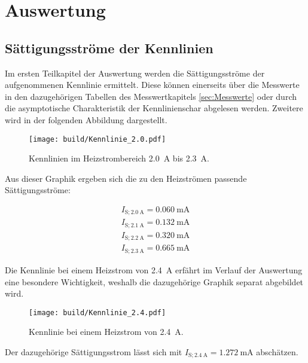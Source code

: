 %

%

\section{Auswertung}
\label{sec:Auswertung}

\subsection{Sättigungsströme der Kennlinien}
\label{sec:Saettigungsstrom}

Im ersten Teilkapitel der Auswertung werden die Sättigungsströme der aufgenommenen Kennlinie ermittelt. Diese können einerseits über die Messwerte in den
dazugehörigen Tabellen des Messwertkapitels \ref{sec:Messwerte} oder durch die asymptotische Charakteristik der Kennlinienschar abgelesen werden. Zweitere 
wird in der folgenden Abbildung dargestellt.

\begin{figure}[H]
    \centering
    \texttt{[image: build/Kennlinie\_2.0.pdf]}
    \caption{Kennlinien im Heizstrombereich \qty{2.0}{\ampere} bis \qty{2.3}{\ampere}.}
    \label{fig:Kennlinien1}
\end{figure}

\noindent Aus dieser Graphik ergeben sich die zu den Heizströmen passende Sättigungsströme:

\begin{align*}
    I_{\text{S};\qty{2.0}{\ampere}} = \qty{0.060}{\milli\ampere}\\
    I_{\text{S};\qty{2.1}{\ampere}} = \qty{0.132}{\milli\ampere}\\   
    I_{\text{S};\qty{2.2}{\ampere}} = \qty{0.320}{\milli\ampere}\\   
    I_{\text{S};\qty{2.3}{\ampere}} = \qty{0.665}{\milli\ampere}
\end{align*}

\noindent Die Kennlinie bei einem Heizstrom von \qty{2.4}{\ampere} erfährt im Verlauf der Auswertung eine besondere Wichtigkeit, weshalb die dazugehörige Graphik 
separat abgebildet wird. 

\begin{figure}[H]
    \centering 
    \texttt{[image: build/Kennlinie\_2.4.pdf]}
    \caption{Kennlinie bei einem Heizstrom von \qty{2.4}{\ampere}.}
    \label{fig:Kennlinien2}
\end{figure}

\noindent Der dazugehörige Sättigungsstrom lässt sich mit $I_{\text{S};\qty{2.4}{\ampere}} = \qty{1.272}{\milli\ampere}$ abschätzen.

